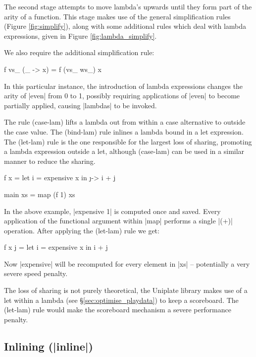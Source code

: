 \documentclass[preprint]{sigplanconf}
\begin{document}
The second stage attempts to move lambda's upwards until they form part of the arity of a function. This stage makes use of the general simplification rules (Figure \ref{fig:simplify}), along with some additional rules which deal with lambda expressions, given in Figure \ref{fig:lambda_simplify}.

We also require the additional simplification rule:

\begin{code}
f vs_ (\ws_ -> x) = f (vs_ ws_) x
\end{code}

In this particular instance, the introduction of lambda expressions changes the arity of |even| from 0 to 1, possibly requiring applications of |even| to become partially applied, causing |lambdas| to be invoked.

The rule (case-lam) lifts a lambda out from within a case alternative to outside the case value. The (bind-lam) rule inlines a lambda bound in a let expression. The (let-lam) rule is the one responsible for the largest loss of sharing, promoting a lambda expression outside a let, although (case-lam) can be used in a similar manner to reduce the sharing.

\begin{example}
\begin{code}
f x = let i = expensive x
      in \j -> i + j

main xs = map (f 1) xs
\end{code}

In the above example, |expensive 1| is computed once and saved. Every application of the functional argument within |map| performs a single |(+)| operation. After applying the (let-lam) rule we get:

\begin{code}
f x j = let i = expensive x
        in i + j
\end{code}

Now |expensive| will be recomputed for every element in |xs| -- potentially a very severe speed penalty.
\end{example}

The loss of sharing is not purely theoretical, the Uniplate library makes use of a let within a lambda (see \S\ref{sec:optimise_playdata}) to keep a scoreboard. The (let-lam) rule would make the scoreboard mechanism a severe performance penalty.

\subsection{Inlining (|inline|)}
\end{document}
